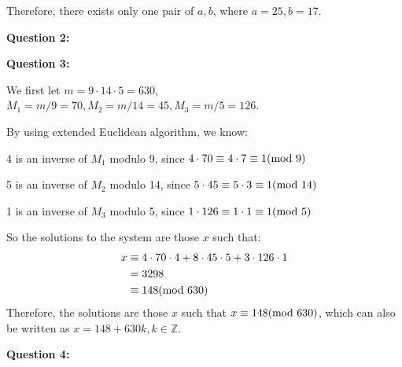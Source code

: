 \documentclass[a4paper,11pt]{article}
\begin{document}
\begin{spacing}{1.4}
    Therefore, there exists only one pair of $a,b$,
    where $a=25, b=17$.

    \vspace{20pt}

    \textbf{Question 2:}


    \vspace{20pt}

    \textbf{Question 3:}

    We first let $m=9\cdot 14\cdot 5=630$,
    $M_1=m/9=70, M_2=m/14=45, M_3=m/5=126$.

    By using extended Euclidean algorithm, we know:

    \hspace{1em} 4 is an inverse of $M_1$ modulo 9, since 
    $4\cdot 70\equiv 4\cdot 7\equiv 1 {\rm (mod\ 9)}$

    \hspace{1em} 5 is an inverse of $M_2$ modulo 14, since 
    $5\cdot 45\equiv 5\cdot 3\equiv 1{\rm (mod\ 14)}$

    \hspace{1em} 1 is an inverse of $M_3$ modulo 5, since 
    $1\cdot 126\equiv 1\cdot 1\equiv 1{\rm (mod\ 5)}$

    So the solutions to the system are those $x$ such that:
    \begin{align*}
        x&\equiv 4\cdot 70\cdot 4+ 8\cdot 45\cdot 5
        + 3 \cdot 126 \cdot 1\\
        &=3298\\
        &\equiv 148{\rm (mod\ 630)}
    \end{align*}
    Therefore, the solutions are those $x$ such that
    $x\equiv 148{\rm (mod\ 630)}$, which can also be written as
    $x=148+630k, k\in \mathbb{Z}$.



    \vspace{20pt}

    \textbf{Question 4:}


\end{spacing}
\end{document}
